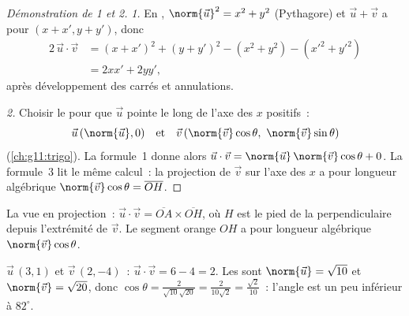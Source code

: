 \begin{proof}[Démonstration de 1 et 2]
\emph{1.} En , $\norm{\vec u}^2 = x^2 + y^2$ (Pythagore) et
$\vec u + \vec v$ a pour  $(x + x', y + y')$, donc
\begin{align*}
2\,\vec u \cdot \vec v
&= (x + x')^2 + (y + y')^2 - (x^2 + y^2) - (x'^2 + y'^2)\\
&= 2xx' + 2yy',
\end{align*}
après développement des carrés et annulations.

\emph{2.} Choisir le  pour que $\vec u$ pointe le long de l'axe des
$x$ positifs~:
\[
\vec u\,(\norm{\vec u}, 0)
\quad\text{et}\quad
\vec v\,(\norm{\vec v}\cos\theta,\ \norm{\vec v}\sin\theta)
\]
(\cref{ch:g11:trigo}). La formule~1 donne alors
$\vec u \cdot \vec v = \norm{\vec u}\,\norm{\vec v}\cos\theta + 0$. La
formule~3 lit le même calcul~: la projection de $\vec v$ sur l'axe des
$x$ a pour longueur algébrique $\norm{\vec v}\cos\theta =
\overline{OH}$.
\end{proof}

\begin{omfigure}

{\small La vue en projection~: $\vec u \cdot \vec v = \overline{OA}
\times \overline{OH}$, où $H$ est le pied de la perpendiculaire depuis
l'extrémité de $\vec v$. Le segment orange $OH$ a pour longueur
algébrique $\norm{\vec v}\cos\theta$.}
\end{omfigure}

\begin{example}\label{ex:g11:scal:compute}
$\vec u\,(3, 1)$ et $\vec v\,(2, -4)$~:
$\vec u \cdot \vec v = 6 - 4 = 2$. Les  sont
$\norm{\vec u} = \sqrt{10}$ et $\norm{\vec v} = \sqrt{20}$, donc
$\cos\theta = \frac{2}{\sqrt{10}\sqrt{20}} = \frac{2}{10\sqrt2}
= \frac{\sqrt2}{10}$~: l'angle est un peu inférieur à $82^\circ$.
\end{example}

